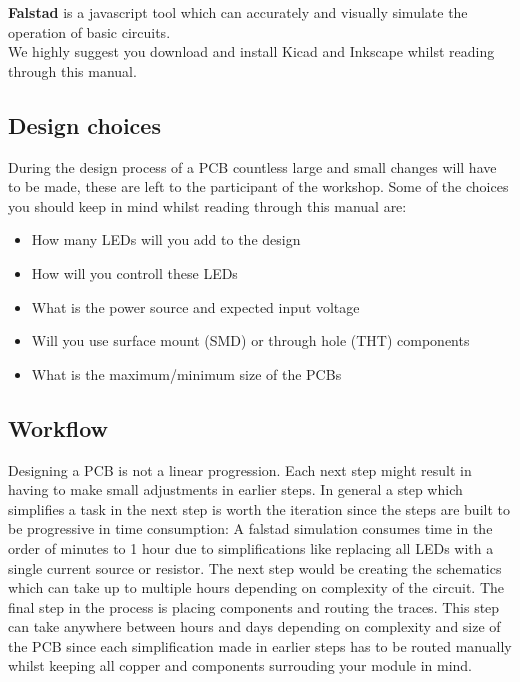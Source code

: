 \documentclass[12pt]{article}
\begin{document}
\textbf{Falstad} is a javascript tool which can accurately and visually simulate the operation of basic circuits. \\
\vspace{2ex}
We highly suggest you download and install Kicad and Inkscape whilst reading through this manual.

\subsection{Design choices}
During the design process of a PCB countless large and small changes will have to be made, these are left to the participant of the workshop. Some of the choices you should keep in mind whilst reading through this manual are:

\begin{itemize}
	\item How many LEDs will you add to the design
	\item How will you controll these LEDs
	\item What is the power source and expected input voltage
	\item Will you use surface mount (SMD) or through hole (THT) components
	\item What is the maximum/minimum size of the PCBs
\end{itemize}

\subsection{Workflow}

Designing a PCB is not a linear progression. Each next step might result in having to make small adjustments in earlier steps. In general a step which simplifies a task in the next step is worth the iteration since the steps are built to be progressive in time consumption:
A falstad simulation consumes time in the order of minutes to 1 hour due to simplifications like replacing all LEDs with a single current source or resistor. The next step would be creating the schematics which can take up to multiple hours depending on complexity of the circuit. The final step in the process is placing components and routing the traces. This step can take anywhere between hours and days depending on complexity and size of the PCB since each simplification made in earlier steps has to be routed manually whilst keeping all copper and components surrouding your module in mind.
\end{document}

